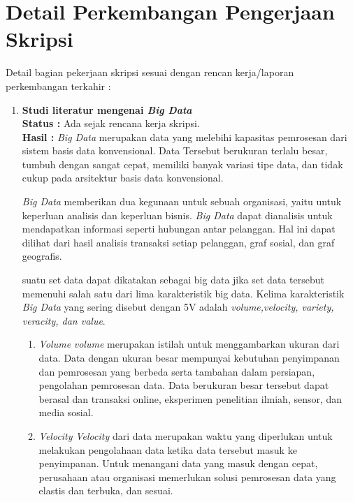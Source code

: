 \documentclass[a4paper,twoside]{article}
\begin{document}
\section{Detail Perkembangan Pengerjaan Skripsi}
Detail bagian pekerjaan skripsi sesuai dengan rencan kerja/laporan perkembangan terkahir :
	\begin{enumerate}
		\item \textbf{Studi literatur mengenai \textit{Big Data}}\\
		{\bf Status :} Ada sejak rencana kerja skripsi.\\
		{\bf Hasil :} \textit{Big Data} merupakan data yang melebihi kapasitas pemrosesan dari 					sistem basis data konvensional. Data Tersebut berukuran terlalu besar, tumbuh dengan sangat 			cepat, memiliki banyak variasi tipe data, dan tidak cukup pada arsitektur basis data 					konvensional.

		\textit{Big Data} memberikan dua kegunaan untuk sebuah organisasi, yaitu untuk keperluan 				analisis dan keperluan bisnis. \textit{Big Data} dapat dianalisis untuk mendapatkan 					informasi seperti hubungan antar pelanggan. Hal ini dapat dilihat dari hasil analisis 					transaksi setiap pelanggan, graf sosial, dan graf geografis.

		suatu set data dapat dikatakan sebagai big data jika set data tersebut memenuhi salah satu 				dari lima karakteristik big data. Kelima karakteristik \textit{Big Data} yang sering disebut 		dengan 5V adalah \textit{volume,velocity, variety, veracity, dan value}.
		
		\begin{enumerate}
		\item{\textit{Volume} \newline
		\textit{volume} merupakan istilah untuk menggambarkan ukuran dari data. Data dengan ukuran 				besar mempunyai kebutuhan penyimpanan dan pemrosesan yang berbeda serta tambahan dalam 					persiapan, pengolahan pemrosesan data. Data berukuran besar tersebut dapat berasal dan 					transaksi online, eksperimen penelitian ilmiah, sensor, dan media sosial.
		}
	
		\item{\textit{Velocity} \newline
		\textit{Velocity} dari data merupakan waktu yang diperlukan untuk melakukan pengolahaan 				data ketika data tersebut masuk ke penyimpanan. Untuk menangani data yang masuk dengan 					cepat, perusahaan atau organisasi memerlukan solusi pemrosesan data yang elastis dan 					terbuka, dan sesuai.
	
}
\end{enumerate}
\end{enumerate}
\end{document}
